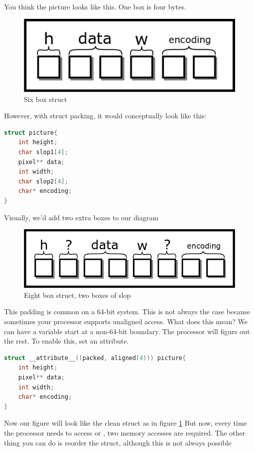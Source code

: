 You think the picture looks like this.
One box is four bytes.

\begin{figure}[H]
\centering
\includegraphics[width=.7\textwidth]{introc/drawings/struct_clean.png}
\caption{Six box struct}
\label{fig:clean_struct}
\end{figure}

However, with struct packing, it would conceptually look like this:

\begin{lstlisting}[language=C]
struct picture{
    int height;
    char slop1[4];
    pixel** data;
    int width;
    char slop2[4];
    char* encoding;
}
\end{lstlisting}

Visually, we'd add two extra boxes to our diagram

\begin{figure}[H]
\centering
\includegraphics[width=.7\textwidth]{introc/drawings/struct_slop.png}
\caption{Eight box struct, two boxes of slop}
\label{fig:sloppy_struct}
\end{figure}

This padding is common on a 64-bit system.
This is not always the case because sometimes your processor supports unaligned access.
What does this mean?
We can have a variable start at a non-64-bit boundary.
The processor will figure out the rest.
To enable this, set an attribute.

\begin{lstlisting}[language=C]
struct __attribute__((packed, aligned(4))) picture{
    int height;
    pixel** data;
    int width;
    char* encoding;
}
\end{lstlisting}

Now our figure will look like the clean struct as in figure  \ref{fig:clean_struct}
But now, every time the processor needs to access  or ,
two memory accesses are required.
The other thing you can do is reorder the struct, although this is not always possible

